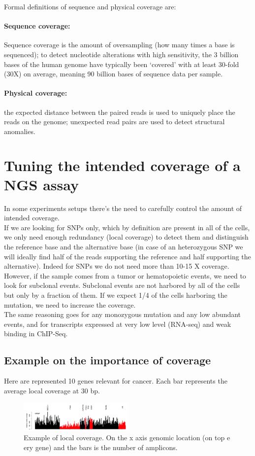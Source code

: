 Formal definitions of sequence and physical coverage are:

\paragraph*{Sequence coverage:}
	Sequence coverage is the amount of oversampling (how many times a base is sequenced); to detect nucleotide alterations with high sensitivity, the 3 billion bases of the human genome have typically been ‘covered’ with at least 30-fold (30X) on average, meaning 90 billion bases of sequence data per sample.
	\paragraph*{Physical coverage:}
		the expected distance between the paired reads is used to uniquely place the reads on the genome; unexpected read pairs are used to detect structural anomalies.



\section{Tuning the intended coverage of a NGS assay}
In some experiments setups there's the need to carefully control the amount of intended coverage. \\
If we are looking for SNPs only, which by definition are present in all of the cells, we only need enough redundancy (local coverage) to detect them and distinguish the reference base and the alternative base (in case of an heterozygous SNP we will ideally find half of the reads supporting the reference and half supporting the alternative). Indeed for SNPs we do not need more than 10-15 X coverage.
\\
However, if the sample comes from a tumor or hematopoietic events, we need to look for subclonal events. Subclonal events are not harbored by all of the cells but only by a fraction of them. If we expect 1/4 of the cells harboring the mutation, we need to increase the coverage. \\
The same reasoning goes for any monozygous mutation and any low abundant events, and for  transcripts expressed at very low level (RNA-seq) and weak binding in ChIP-Seq.

\subsection{Example on the importance of coverage}
Here are represented 10 genes relevant for cancer. Each bar represents the average local coverage at 30 bp.
\begin{figure}[H]
    \centering
    \includegraphics[width=0.5\textwidth]{local_coverage.png}
    \caption{Example of local coverage. On the x axis genomic location (on top e ery gene) and the bars is the number of amplicons. }
    \label{fig:local}
\end{figure}


